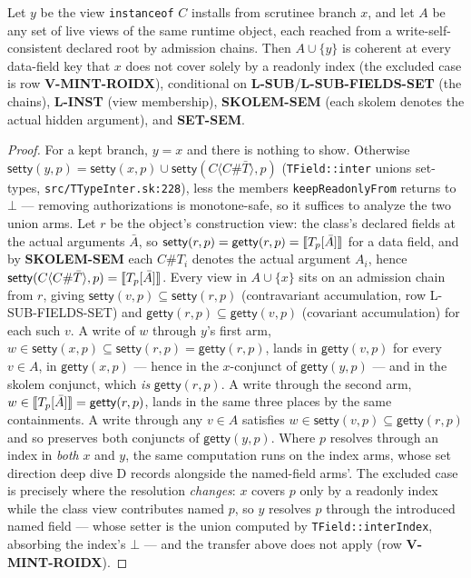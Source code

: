 \documentclass[11pt]{article}
\newcommand{\setty}{\mathsf{setty}}
\newcommand{\getty}{\mathsf{getty}}
\begin{document}
\begin{lemma}
\label{lem:created}
Let $y$ be the view \texttt{instanceof} $C$ installs from scrutinee
branch $x$, and let $A$ be any set of live views of the same runtime
object, each reached from a write-self-consistent declared root by
admission chains. Then $A \cup \{y\}$ is coherent at every data-field
key that $x$ does not cover solely by a readonly index (the excluded
case is row \textbf{V-MINT-ROIDX}), conditional on
\textbf{L-SUB}/\textbf{L-SUB-FIELDS-SET} (the
chains), \textbf{L-INST} (view membership), \textbf{SKOLEM-SEM} (each
skolem denotes the actual hidden argument), and \textbf{SET-SEM}.
\end{lemma}
\begin{proof}
For a kept branch, $y = x$ and there is nothing to show. Otherwise
$\setty(y,p) = \setty(x,p) \cup \setty(C\langle
C\#\bar{T}\rangle,p)$ (\texttt{TField::inter} unions set-types,
\texttt{src/TTypeInter.sk:228}), less the members
\texttt{keepReadonlyFrom} returns to $\bot$ — removing authorizations
is monotone-safe, so it suffices to analyze the two union arms. Let $r$
be the object's construction view: the class's declared fields at the
actual arguments $\bar{A}$, so $\setty(r,p) = \getty(r,p) =
\sem{T_p[\bar{A}]}$ for a data field, and by \textbf{SKOLEM-SEM} each
$C\#T_i$ denotes the actual argument $A_i$, hence
$\setty(C\langle C\#\bar{T}\rangle,p) = \sem{T_p[\bar{A}]}$. Every
view in $A \cup \{x\}$ sits on an admission chain from $r$, giving
$\setty(v,p) \subseteq \setty(r,p)$ (contravariant accumulation, row
L-SUB-FIELDS-SET) and $\getty(r,p) \subseteq \getty(v,p)$ (covariant
accumulation) for each such $v$. A write of $w$ through $y$'s first
arm, $w \in \setty(x,p) \subseteq \setty(r,p) = \getty(r,p)$, lands in
$\getty(v,p)$ for every $v \in A$, in $\getty(x,p)$ — hence in the
$x$-conjunct of $\getty(y,p)$ — and in the skolem conjunct, which
\emph{is} $\getty(r,p)$. A write through the second arm,
$w \in \sem{T_p[\bar{A}]} = \getty(r,p)$, lands in the same three
places by the same containments. A write through any $v \in A$
satisfies $w \in \setty(v,p) \subseteq \getty(r,p)$ and so preserves
both conjuncts of $\getty(y,p)$. Where $p$ resolves through an index in
\emph{both} $x$ and $y$, the same computation runs on the index arms,
whose set direction deep dive D records alongside the named-field
arms'. The excluded case is precisely where the resolution
\emph{changes}: $x$ covers $p$ only by a readonly index while the class
view contributes named $p$, so $y$ resolves $p$ through the introduced
named field — whose setter is the union computed by
\texttt{TField::interIndex}, absorbing the index's $\bot$ — and the
transfer above does not apply (row \textbf{V-MINT-ROIDX}).
\end{proof}
\end{document}
